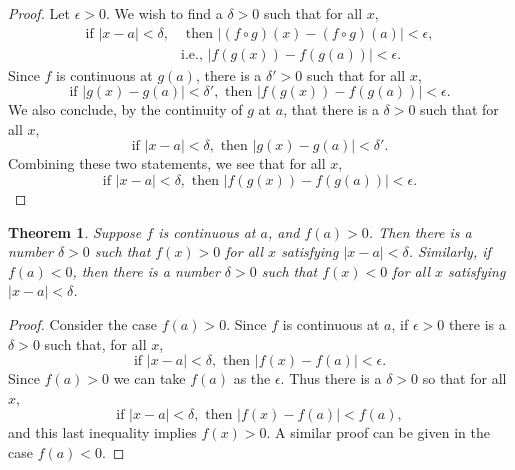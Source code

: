 \documentclass{article}
\newtheorem{theorem}{Theorem}
\begin{document}
\begin{proof}
  Let $\epsilon > 0$. We wish to find a $\delta > 0$ such that for all $x$,
  \begin{align*}
    \text{if } |x - a| < \delta, &\text{ then } |(f \circ g)(x) -
    (f \circ g)(a)| < \epsilon, \\
      &\text{i.e., } |f(g(x)) - f(g(a))| < \epsilon.
  \end{align*}
  Since $f$ is continuous at $g(a)$, there is a $\delta' > 0$ such that for all
  $x$, \begin{equation*}
    \text{if } |g(x) - g(a)| < \delta', \text{ then } |f(g(x)) - f(g(a))| <
      \epsilon.
  \end{equation*}
  We also conclude, by the continuity of $g$ at $a$, that there is a $\delta >
  0$ such that for all $x$, \begin{equation*}
    \text{if } |x - a| < \delta, \text{ then } |g(x) - g(a)| < \delta'.
  \end{equation*}
  Combining these two statements, we see that for all $x$, \begin{equation*}
    \text{if } |x - a| < \delta, \text{ then } |f(g(x)) - f(g(a))| < \epsilon.
  \end{equation*}
\end{proof}

\begin{theorem}
  Suppose $f$ is continuous at $a$, and $f(a) > 0$. Then there is a number
  $\delta > 0$ such that $f(x) > 0$ for all $x$ satisfying $|x - a| < \delta$.
  Similarly, if $f(a) < 0$, then there is a number $\delta > 0$ such that $f(x)
  < 0$ for all $x$ satisfying $|x - a| < \delta$.
\end{theorem}

\begin{proof}
  Consider the case $f(a) > 0$. Since $f$ is continuous at $a$, if $\epsilon >
  0$ there is a $\delta > 0$ such that, for all $x$, \begin{equation*}
    \text{if } |x - a| < \delta, \text{ then } |f(x) - f(a)| < \epsilon.
  \end{equation*}
  Since $f(a) > 0$ we can take $f(a)$ as the $\epsilon$. Thus there is a
  $\delta > 0$ so that for all $x$, \begin{equation*}
    \text{if } |x - a| < \delta, \text{ then } |f(x) - f(a)| < f(a),
  \end{equation*}
  and this last inequality implies $f(x) > 0$. A similar proof can be given in
  the case $f(a) < 0$.
\end{proof}
\end{document}

